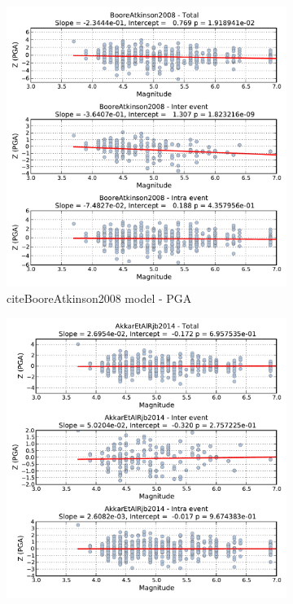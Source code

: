 \begin{figure}[htb]
  \centering
  \begin{subfigure}[b]{0.49\textwidth}
      \includegraphics[width=\textwidth]{./figures/residuals/BA2008_Magnitude_PGA.pdf}
      \caption{citeBooreAtkinson2008 model - PGA}
      \label{fig:pga_mag_ba2008}
  \end{subfigure}
    \begin{subfigure}[b]{0.49\textwidth}
      \includegraphics[width=\textwidth]{./figures/residuals/Akkar2014_Magnitude_PGA.pdf}

\end{subfigure}
\end{figure}
